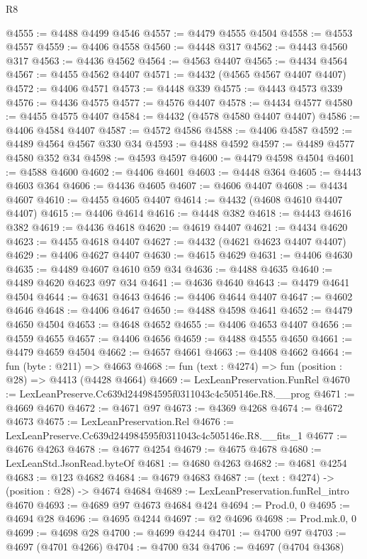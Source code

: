 \begin{lexlean}{R8}
\begin{coremodule}
@4555 := @4488 @4499 @4546
@4557 := @4479 @4555 @4504
@4558 := @4553 @4557
@4559 := @4406 @4558
@4560 := @4448 @317
@4562 := @4443 @4560 @317
@4563 := @4436 @4562
@4564 := @4563 @4407
@4565 := @4434 @4564
@4567 := @4455 @4562 @4407
@4571 := @4432 (@4565 @4567 @4407 @4407)
@4572 := @4406 @4571
@4573 := @4448 @339
@4575 := @4443 @4573 @339
@4576 := @4436 @4575
@4577 := @4576 @4407
@4578 := @4434 @4577
@4580 := @4455 @4575 @4407
@4584 := @4432 (@4578 @4580 @4407 @4407)
@4586 := @4406 @4584 @4407
@4587 := @4572 @4586
@4588 := @4406 @4587
@4592 := @4489 @4564 @4567 @330 @34
@4593 := @4488 @4592
@4597 := @4489 @4577 @4580 @352 @34
@4598 := @4593 @4597
@4600 := @4479 @4598 @4504
@4601 := @4588 @4600
@4602 := @4406 @4601
@4603 := @4448 @364
@4605 := @4443 @4603 @364
@4606 := @4436 @4605
@4607 := @4606 @4407
@4608 := @4434 @4607
@4610 := @4455 @4605 @4407
@4614 := @4432 (@4608 @4610 @4407 @4407)
@4615 := @4406 @4614
@4616 := @4448 @382
@4618 := @4443 @4616 @382
@4619 := @4436 @4618
@4620 := @4619 @4407
@4621 := @4434 @4620
@4623 := @4455 @4618 @4407
@4627 := @4432 (@4621 @4623 @4407 @4407)
@4629 := @4406 @4627 @4407
@4630 := @4615 @4629
@4631 := @4406 @4630
@4635 := @4489 @4607 @4610 @59 @34
@4636 := @4488 @4635
@4640 := @4489 @4620 @4623 @97 @34
@4641 := @4636 @4640
@4643 := @4479 @4641 @4504
@4644 := @4631 @4643
@4646 := @4406 @4644 @4407
@4647 := @4602 @4646
@4648 := @4406 @4647
@4650 := @4488 @4598 @4641
@4652 := @4479 @4650 @4504
@4653 := @4648 @4652
@4655 := @4406 @4653 @4407
@4656 := @4559 @4655
@4657 := @4406 @4656
@4659 := @4488 @4555 @4650
@4661 := @4479 @4659 @4504
@4662 := @4657 @4661
@4663 := @4408 @4662
@4664 := fun (byte : @211) => @4663
@4668 := fun (text : @4274) => fun (position : @28) => @4413 (@4428 @4664)
@4669 := LexLeanPreservation.FunRel
@4670 := LexLeanPreserve.Cc639d244984595f0311043c4c505146e.R8.__prog
@4671 := @4669 @4670
@4672 := @4671 @97
@4673 := @4369 @4268
@4674 := @4672 @4673
@4675 := LexLeanPreservation.Rel
@4676 := LexLeanPreserve.Cc639d244984595f0311043c4c505146e.R8.__fits_1
@4677 := @4676 @4263
@4678 := @4677 @4254
@4679 := @4675 @4678
@4680 := LexLeanStd.JsonRead.byteOf
@4681 := @4680 @4263
@4682 := @4681 @4254
@4683 := @123 @4682
@4684 := @4679 @4683
@4687 := (text : @4274) -> (position : @28) -> @4674 @4684
@4689 := LexLeanPreservation.funRel_intro @4670
@4693 := @4689 @97 @4673 @4684 @424
@4694 := Prod.{0, 0}
@4695 := @4694 @28
@4696 := @4695 @4244
@4697 := @2 @4696
@4698 := Prod.mk.{0, 0}
@4699 := @4698 @28
@4700 := @4699 @4244
@4701 := @4700 @97
@4703 := @4697 (@4701 @4266)
@4704 := @4700 @34
@4706 := @4697 (@4704 @4368)

\end{coremodule}
\end{lexlean}

